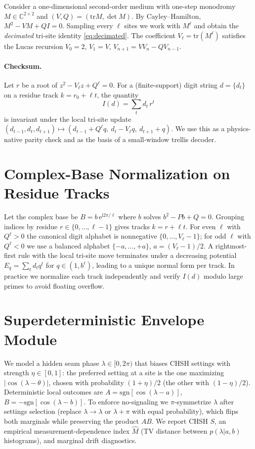 \documentclass[11pt]{article}
\newcommand{\C}{\mathbb{C}}
\newcommand{\e}{\mathrm{e}}
\newcommand{\im}{\mathrm{i}}
\begin{document}
Consider a one-dimensional second-order medium with one-step monodromy $M\in\C^{2\times2}$ and
$(V,Q)=(\mathrm{tr}M,\det M)$. By Cayley--Hamilton, $M^2 - V M + Q I = 0$. Sampling every $\ell$
sites we work with $M^\ell$ and obtain the \emph{decimated} tri-site identity
\eqref{eq:decimated}. The coefficient $V_\ell=\mathrm{tr}(M^\ell)$ satisfies the Lucas recursion
$V_0=2$, $V_1=V$, $V_{n+1}=V V_n - Q V_{n-1}$.

\paragraph{Checksum.} Let $r$ be a root of $z^2 - V_\ell z + Q^\ell=0$. For a (finite-support)
digit string $d=\{d_t\}$ on a residue track $k=r_0+\ell t$, the quantity
\begin{equation}
I(d)=\sum_t d_t\,r^t
\end{equation}
is invariant under the local tri-site update $(d_{t-1},d_t,d_{t+1})\mapsto(d_{t-1}+Q^\ell q,\ d_t-V_\ell q,\ d_{t+1}+q)$.
We use this as a physics-native parity check and as the basis of a small-window trellis decoder.

\section{Complex-Base Normalization on Residue Tracks}
\label{sec:normalization}

Let the complex base be $B=b\,\e^{\im2\pi/\ell}$ where $b$ solves $b^2-Pb+Q=0$. Grouping indices by
residue $r\in\{0,\dots,\ell-1\}$ gives tracks $k=r+\ell t$. For even $\ell$ with $Q^\ell>0$ the
canonical digit alphabet is nonnegative $\{0,\dots,V_\ell-1\}$; for odd $\ell$ with $Q^\ell<0$ we
use a balanced alphabet $\{-a,\dots,+a\}$, $a=(V_\ell-1)/2$. A rightmost-first rule with the local
tri-site move terminates under a decreasing potential $E_q=\sum_t d_t q^t$ for $q\in(1,b^\ell)$,
leading to a unique normal form per track. In practice we normalize each track independently and
verify $I(d)$ modulo large primes to avoid floating overflow.

\section{Superdeterministic Envelope Module}
\label{sec:sd}

We model a hidden seam phase $\lambda\in[0,2\pi)$ that biases CHSH settings with strength $\eta\in[0,1]$:
the preferred setting at a site is the one maximizing $|\cos(\lambda-\theta)|$, chosen with probability
$(1+\eta)/2$ (the other with $(1-\eta)/2$). Deterministic local outcomes are
$A=\mathrm{sgn}[\cos(\lambda-a)]$, $B=-\mathrm{sgn}[\cos(\lambda-b)]$. To enforce no-signaling we
$\pi$-symmetrize $\lambda$ after settings selection (replace $\lambda\to\lambda$ or $\lambda{+}\pi$
with equal probability), which flips both marginals while preserving the product $AB$. We report
CHSH $S$, an empirical measurement-dependence index $\hat M$ (TV distance between $p(\lambda|a,b)$
histograms), and marginal drift diagnostics.
\end{document}
